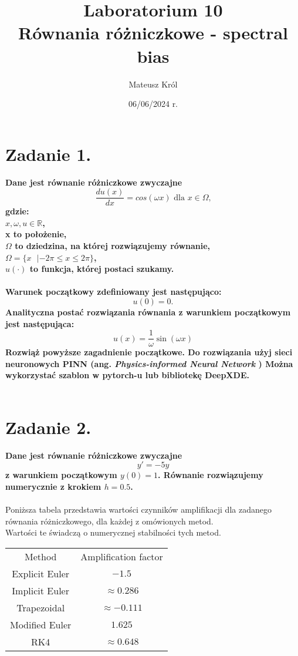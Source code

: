 \documentclass{article}
\title{%
Laboratorium 10\\
  \huge Równania różniczkowe - spectral bias}
\author{Mateusz Król}
\date{06/06/2024 r.}
\begin{document}
\maketitle

 
\section*{Zadanie 1.}
\textbf{Dane jest równanie różniczkowe zwyczajne
$$ \frac{du(x)}{dx} = cos(\omega x) \text{ dla } x \in \Omega \text{,}  $$
gdzie: \\
$x, \omega, u \in \mathbb{R}$,\\
x to położenie,\\
$\Omega$ to dziedzina, na której rozwiązujemy równanie, \\
$\Omega = \{x \text{  }| -2\pi \le x \le 2\pi\}$, \\
$u(\cdot)$ to funkcja, której postaci szukamy. \\\\
Warunek początkowy zdefiniowany jest następująco:
$$ u(0) = 0 \text{.}$$
Analityczna postać rozwiązania równania z warunkiem początkowym
jest następująca:
$$ u(x) = \frac{1}{\omega} \sin(\omega x) $$
Rozwiąż powyższe zagadnienie początkowe. Do rozwiązania użyj sieci neuronowych
PINN (ang. \textit{Physics-informed Neural Network} ) 
Można wykorzystać szablon w pytorch-u lub bibliotekę DeepXDE.
}\\\\


\section*{Zadanie 2.}
\textbf{Dane jest równanie różniczkowe zwyczajne
$$y'=-5y$$
z warunkiem początkowym $y(0) = 1$. Równanie rozwiązujemy numerycznie z
krokiem $h = 0.5$.
}\\\\

Poniższa tabela przedstawia wartości czynników amplifikacji dla zadanego
równania różniczkowego, dla każdej z omówionych metod.\\
Wartości te świadczą o numerycznej stabilności tych metod.

\begin{center}
  \begin{tabular}{c c} 
   Method & Amplification factor\\
   Explicit Euler & $-1.5$\\
   Implicit Euler & $\approx 0.286$\\
   Trapezoidal  & $\approx -0.111$\\
   Modified Euler & $1.625$\\
   RK4 & $\approx 0.648$
  \end{tabular}
\end{center}
\end{document}
